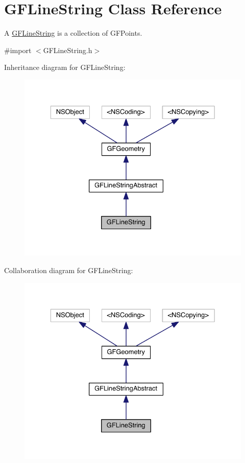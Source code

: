 \hypertarget{interface_g_f_line_string}{}\section{G\+F\+Line\+String Class Reference}
\label{interface_g_f_line_string}


A \hyperlink{interface_g_f_line_string}{G\+F\+Line\+String} is a collection of G\+F\+Points.  




{\ttfamily \#import $<$G\+F\+Line\+String.\+h$>$}



Inheritance diagram for G\+F\+Line\+String\+:\nopagebreak
\begin{figure}[H]
\begin{center}
\leavevmode
\includegraphics[width=329pt]{interface_g_f_line_string__inherit__graph}
\end{center}
\end{figure}


Collaboration diagram for G\+F\+Line\+String\+:\nopagebreak
\begin{figure}[H]
\begin{center}
\leavevmode
\includegraphics[width=329pt]{interface_g_f_line_string__coll__graph}
\end{center}
\end{figure}
